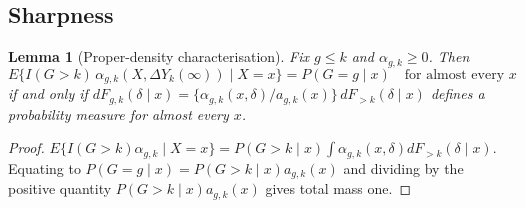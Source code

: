 \documentclass[12pt]{article}
\newtheorem{lemma}{Lemma}
\theoremstyle{remark}
\begin{document}
\subsection{Sharpness}

\begin{lemma}[Proper-density characterisation]
\label{lem:proper}
Fix $g \le k$ and $\alpha_{g,k} \ge 0$. Then
\[
E\{I(G{>}k)\,\alpha_{g,k}(X, \Delta Y_k(\infty)) \mid X = x\} = P(G{=}g \mid x)
\quad \text{for almost every } x
\]
if and only if
$dF_{g,k}(\delta \mid x) = \{\alpha_{g,k}(x,\delta)/a_{g,k}(x)\}\,dF_{>k}(\delta \mid x)$
defines a probability measure for almost every $x$.
\end{lemma}

\begin{proof}
$E\{I(G{>}k)\alpha_{g,k} \mid X{=}x\} = P(G{>}k \mid x)\int\alpha_{g,k}(x,\delta)dF_{>k}(\delta\mid x)$.
Equating to $P(G{=}g\mid x) = P(G{>}k\mid x)a_{g,k}(x)$ and dividing by the positive
quantity $P(G{>}k\mid x)a_{g,k}(x)$ gives total mass one.
\end{proof}
\end{document}
